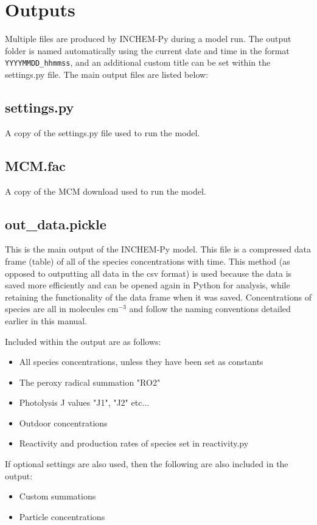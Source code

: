 \documentclass[a4paper]{refart}
\begin{document}
\newpage
\section{Outputs}\label{outputs}
Multiple files are produced by INCHEM-Py during a model run. The output folder is named automatically using the current date and time in the format \texttt{YYYYMMDD\_hhmmss}, and an additional custom title can be set within the settings.py file. The main output files are listed below: 

\subsection{settings.py}
A copy of the settings.py file used to run the model.

\subsection{MCM.fac}
A copy of the MCM download used to run the model.

\subsection{out\_data.pickle}
This is the main output of the INCHEM-Py model. This file is a compressed data frame (table) of all of the species concentrations with time. This method (as opposed to outputting all data in the csv format) is used because the data is saved more efficiently and can be opened again in Python for analysis, while retaining the functionality of the data frame when it was saved. Concentrations of species are all in molecules cm$^{-3}$ and follow the naming conventions detailed earlier in this manual.

Included within the output are as follows:
\begin{itemize}
    \item All species concentrations, unless they have been set as constants
    \item The peroxy radical summation "RO2"
    \item Photolysis J values "J1", "J2" etc...
    \item Outdoor concentrations
    \item Reactivity and production rates of species set in  reactivity.py 
\end{itemize}
If optional settings are also used, then the following are also included in the output:
\begin{itemize}
    \item Custom summations
    \item Particle concentrations
\end{itemize}
\end{document}
